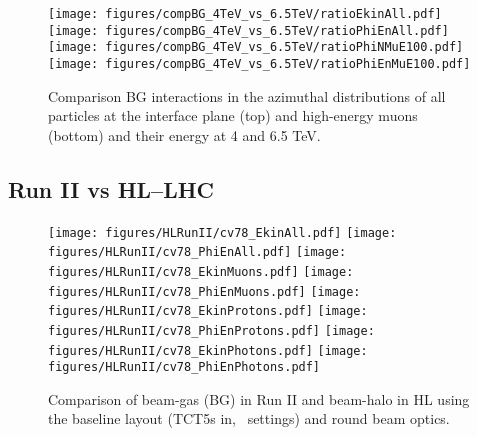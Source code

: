\begin{figure}%
\begin{center}
  \texttt{[image: figures/compBG\_4TeV\_vs\_6.5TeV/ratioEkinAll.pdf]}
  \texttt{[image: figures/compBG\_4TeV\_vs\_6.5TeV/ratioPhiEnAll.pdf]}
  \texttt{[image: figures/compBG\_4TeV\_vs\_6.5TeV/ratioPhiNMuE100.pdf]}
  \texttt{[image: figures/compBG\_4TeV\_vs\_6.5TeV/ratioPhiEnMuE100.pdf]}
\end{center}
\vspace{-0.6cm}
 \caption{Comparison BG interactions in the azimuthal distributions of all particles at the interface plane (top) and high-energy muons (bottom) and their energy at 4 and 6.5 TeV.
  \label{compBGrun1run2}}
\end{figure}


\subsection{Run II vs HL--LHC}

\begin{figure}
\begin{center}
  \texttt{[image: figures/HLRunII/cv78\_EkinAll.pdf]}
  \texttt{[image: figures/HLRunII/cv78\_PhiEnAll.pdf]}
  \texttt{[image: figures/HLRunII/cv78\_EkinMuons.pdf]}
  \texttt{[image: figures/HLRunII/cv78\_PhiEnMuons.pdf]}
  \texttt{[image: figures/HLRunII/cv78\_EkinProtons.pdf]}
  \texttt{[image: figures/HLRunII/cv78\_PhiEnProtons.pdf]}
  \texttt{[image: figures/HLRunII/cv78\_EkinPhotons.pdf]}
  \texttt{[image: figures/HLRunII/cv78\_PhiEnPhotons.pdf]}
\end{center}
\vspace{-0.6cm}
 \caption{Comparison of beam-gas (BG) in Run II and beam-halo in HL using the baseline layout (TCT5s in, \twosigmaret~settings) and round beam optics.
  \label{fig:hlrun2}}
\end{figure}
